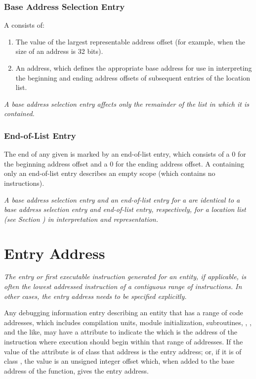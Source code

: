 \subsubsection{Base Address Selection Entry}
\label{chap:baseaddressselectionentry}
A  consists of:
\begin{enumerate}[1. ]
\item The value of the largest representable address offset 
(for example, \wffffffff when the size of an address is 32 bits).

\item An address, which defines the appropriate base address 
for use in interpreting the beginning and ending address offsets 
of subsequent entries of the location list.
\end{enumerate}

\textit{A base address selection entry affects only the 
remainder of 
\bb
the 
\eb
list in which it is contained.}

\subsubsection{End-of-List Entry}
The end of any given  is marked by an 
end-of-list entry, 
which consists of a 0 for the beginning address
offset and a 0 for the ending address offset. 
A 
containing only an end-of-list entry describes an empty scope
(which contains no instructions).

\textit{A base address selection entry and an 
end-of-list entry for
a  
are identical to a base address selection entry
and end-of-list entry, respectively, for a location list
(see Section ) 
in interpretation and representation.}


\section{Entry Address}
\label{chap:entryaddress}
\textit{The entry or first executable instruction generated
for an entity, if applicable, is often the lowest addressed
instruction of a contiguous range of instructions. In other
cases, the entry address needs to be specified explicitly.}

Any debugging information entry describing an entity that has
a range of code addresses, which includes compilation units,
module initialization, subroutines, 
,
,
and the like, may have a \DWATentrypcDEFN{} attribute 
to indicate the 
\bb
{} which is the address of the 
instruction where execution should begin
\eb
within that range\hypertarget{chap:entryaddressofscope}{}
of addresses. 
\bb
If the value of the \DWATentrypcNAME{} attribute is of
class \CLASSaddress{} that address is the entry address;
or, 
\eb
if it is of class
\CLASSconstant, the value is an unsigned integer offset which, when
added to the base address of the function, gives the entry
address. 


